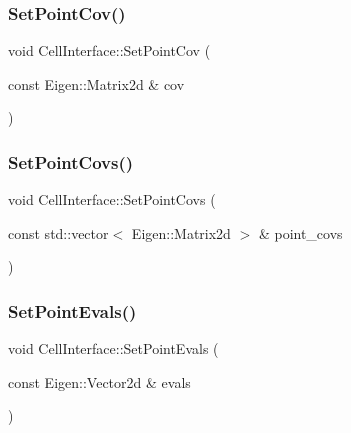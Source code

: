 \mbox{\label{classCellInterface_a4f7df38faf10bc512fa7a640f6ec379e}} 
\subsubsection{\texorpdfstring{Set\+Point\+Cov()}{SetPointCov()}}
{\footnotesize\ttfamily void Cell\+Interface\+::\+Set\+Point\+Cov (\begin{DoxyParamCaption}\item[{const Eigen\+::\+Matrix2d \&}]{cov }\end{DoxyParamCaption})\hspace{0.3cm}{\ttfamily [inline]}}

\mbox{\label{classCellInterface_a3ad8b58a4d938ea29392576d74ef61df}} 
\subsubsection{\texorpdfstring{Set\+Point\+Covs()}{SetPointCovs()}}
{\footnotesize\ttfamily void Cell\+Interface\+::\+Set\+Point\+Covs (\begin{DoxyParamCaption}\item[{const std\+::vector$<$ Eigen\+::\+Matrix2d $>$ \&}]{point\+\_\+covs }\end{DoxyParamCaption})\hspace{0.3cm}{\ttfamily [inline]}}

\mbox{\label{classCellInterface_a5810d27097b1ecb8a4f4764ea18cec51}} 
\subsubsection{\texorpdfstring{Set\+Point\+Evals()}{SetPointEvals()}}
{\footnotesize\ttfamily void Cell\+Interface\+::\+Set\+Point\+Evals (\begin{DoxyParamCaption}\item[{const Eigen\+::\+Vector2d \&}]{evals }\end{DoxyParamCaption})\hspace{0.3cm}{\ttfamily [inline]}}

